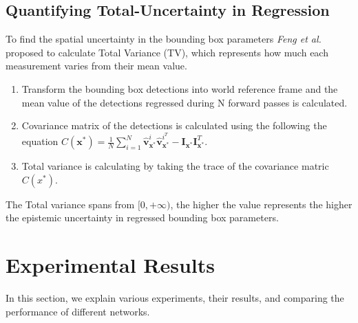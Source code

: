 \documentclass[10pt,twocolumn,letterpaper]{article}
\begin{document}
         \subsection{Quantifying Total-Uncertainty in Regression}
         \label{uncertainty in bounding box regression}
         To find the spatial uncertainty in the bounding box parameters \textit{Feng et al.} \cite{Feng2018} proposed to calculate Total Variance (TV), which represents how much each measurement varies from their mean value.
         
         \begin{enumerate}
             \item Transform the bounding box detections into world reference frame and the mean value of the detections regressed during N forward passes is calculated.
             \item Covariance matrix of the detections is calculated using the following the equation $C\left(\mathbf{x}^{*}\right)=\frac{1}{N} \sum_{i=1}^{N} \hat{\mathbf{v}}_{\mathbf{x}^{*}}^{i} \hat{\mathbf{v}}_{\mathbf{x}^{*}}^{i^{T}}-\mathbf{I}_{\mathbf{x}^{*}} \mathbf{I}_{\mathbf{x}^{*}}^{T}$.
             \item Total variance is calculating by taking the trace of the covariance matric $C(x^{*})$.
         \end{enumerate}
         
         The Total variance spans from $[0,+\infty)$, the higher the value represents the higher the epistemic uncertainty in regressed bounding box parameters.
\section{Experimental Results}
In this section, we explain various experiments, their results, and comparing the performance of different networks. 
\end{document}
